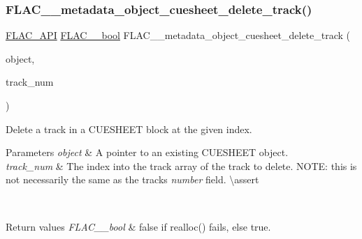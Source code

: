 \subsubsection{\texorpdfstring{FLAC\_\_metadata\_object\_cuesheet\_delete\_track()}{FLAC\_\_metadata\_object\_cuesheet\_delete\_track()}}
{\footnotesize\ttfamily \mbox{\hyperlink{group__flac__export_ga56ca07df8a23310707732b1c0007d6f5}{F\+L\+A\+C\+\_\+\+A\+PI}} \mbox{\hyperlink{ordinals_8h_a95103469f1cbd78b8cf250194985b34e}{F\+L\+A\+C\+\_\+\+\_\+bool}} F\+L\+A\+C\+\_\+\+\_\+metadata\+\_\+object\+\_\+cuesheet\+\_\+delete\+\_\+track (\begin{DoxyParamCaption}\item[{\mbox{\hyperlink{struct_f_l_a_c_____stream_metadata}{F\+L\+A\+C\+\_\+\+\_\+\+Stream\+Metadata}} $\ast$}]{object,  }\item[{unsigned}]{track\+\_\+num }\end{DoxyParamCaption})}

Delete a track in a C\+U\+E\+S\+H\+E\+ET block at the given index.


\begin{DoxyParams}{Parameters}
{\em object} & A pointer to an existing C\+U\+E\+S\+H\+E\+ET object. \\
\hline
{\em track\+\_\+num} & The index into the track array of the track to delete. N\+O\+TE\+: this is not necessarily the same as the track\textquotesingle{}s {\itshape number} field. \textbackslash{}assert 
\begin{DoxyCode}{1}
\end{DoxyCode}
 
\begin{DoxyCode}{1}
\end{DoxyCode}
 
\begin{DoxyCode}{1}
\end{DoxyCode}
 \\
\hline
\end{DoxyParams}

\begin{DoxyRetVals}{Return values}
{\em F\+L\+A\+C\+\_\+\+\_\+bool} & {\ttfamily false} if realloc() fails, else {\ttfamily true}. \\
\hline
\end{DoxyRetVals}
\mbox{\label{group__flac__metadata__object_ga87855591d933cd6371010a675f0bc629}} 
